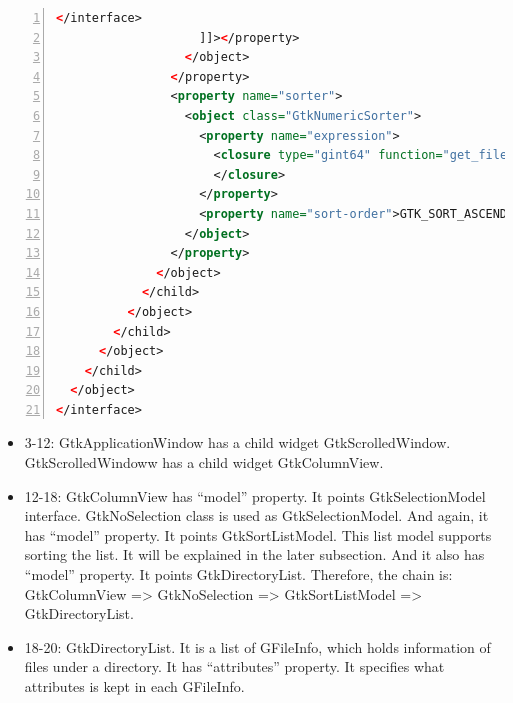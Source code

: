 \begin{lstlisting}[language=XML, numbers=left]
</interface>
                    ]]></property>
                  </object>
                </property>
                <property name="sorter">
                  <object class="GtkNumericSorter">
                    <property name="expression">
                      <closure type="gint64" function="get_file_unixtime_modified">
                      </closure>
                    </property>
                    <property name="sort-order">GTK_SORT_ASCENDING</property>
                  </object>
                </property>
              </object>
            </child>
          </object>
        </child>
      </object>
    </child>
  </object>
</interface>
\end{lstlisting}

\begin{itemize}
\tightlist
\item
  3-12: GtkApplicationWindow has a child widget GtkScrolledWindow.
  GtkScrolledWindoww has a child widget GtkColumnView.
\item
  12-18: GtkColumnView has ``model'' property. It points
  GtkSelectionModel interface. GtkNoSelection class is used as
  GtkSelectionModel. And again, it has ``model'' property. It points
  GtkSortListModel. This list model supports sorting the list. It will
  be explained in the later subsection. And it also has ``model''
  property. It points GtkDirectoryList. Therefore, the chain is:
  GtkColumnView =\textgreater{} GtkNoSelection =\textgreater{}
  GtkSortListModel =\textgreater{} GtkDirectoryList.
\item
  18-20: GtkDirectoryList. It is a list of GFileInfo, which holds
  information of files under a directory. It has ``attributes''
  property. It specifies what attributes is kept in each GFileInfo.


\end{itemize}
